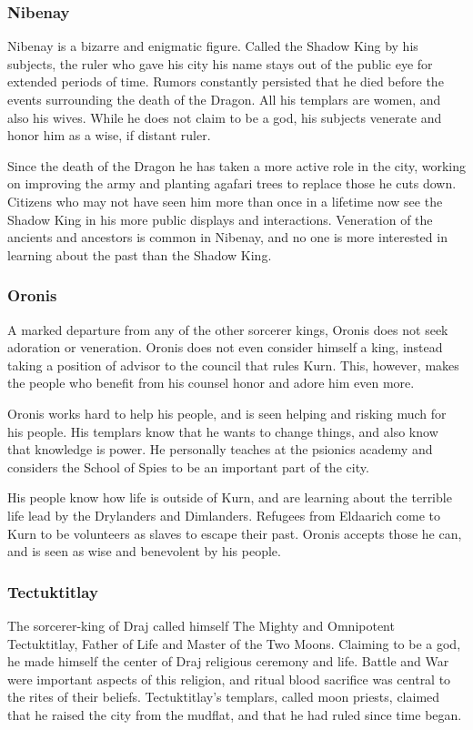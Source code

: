 \subsubsection{Nibenay}
Nibenay is a bizarre and enigmatic figure. Called the Shadow King by his subjects, the ruler who gave his city his name stays out of the public eye for extended periods of time. Rumors constantly persisted that he died before the events surrounding the death of the Dragon. All his templars are women, and also his wives. While he does not claim to be a god, his subjects venerate and honor him as a wise, if distant ruler.

Since the death of the Dragon he has taken a more active role in the city, working on improving the army and planting agafari trees to replace those he cuts down. Citizens who may not have seen him more than once in a lifetime now see the Shadow King in his more public displays and interactions. Veneration of the ancients and ancestors is common in Nibenay, and no one is more interested in learning about the past than the Shadow King.

\subsubsection{Oronis}
A marked departure from any of the other sorcerer kings, Oronis does not seek adoration or veneration. Oronis does not even consider himself a king, instead taking a position of advisor to the council that rules Kurn. This, however, makes the people who benefit from his counsel honor and adore him even more.

Oronis works hard to help his people, and is seen helping and risking much for his people. His templars know that he wants to change things, and also know that knowledge is power. He personally teaches at the psionics academy and considers the School of Spies to be an important part of the city.

His people know how life is outside of Kurn, and are learning about the terrible life lead by the Drylanders and Dimlanders. Refugees from Eldaarich come to Kurn to be volunteers as slaves to escape their past. Oronis accepts those he can, and is seen as wise and benevolent by his people.

\subsubsection{Tectuktitlay}
The sorcerer-king of Draj called himself The Mighty and Omnipotent Tectuktitlay, Father of Life and Master of the Two Moons. Claiming to be a god, he made himself the center of Draj religious ceremony and life. Battle and War were important aspects of this religion, and ritual blood sacrifice was central to the rites of their beliefs. Tectuktitlay's templars, called moon priests, claimed that he raised the city from the mudflat, and that he had ruled since time began.

